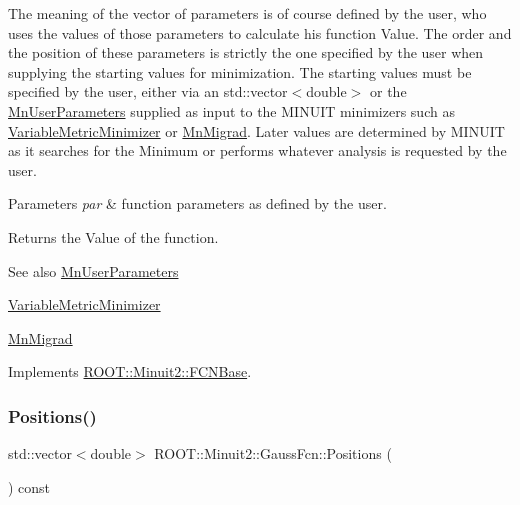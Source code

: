 The meaning of the vector of parameters is of course defined by the user, who uses the values of those parameters to calculate his function Value. The order and the position of these parameters is strictly the one specified by the user when supplying the starting values for minimization. The starting values must be specified by the user, either via an std\+::vector$<$double$>$ or the \mbox{\hyperlink{classROOT_1_1Minuit2_1_1MnUserParameters}{Mn\+User\+Parameters}} supplied as input to the M\+I\+N\+U\+IT minimizers such as \mbox{\hyperlink{classROOT_1_1Minuit2_1_1VariableMetricMinimizer}{Variable\+Metric\+Minimizer}} or \mbox{\hyperlink{classROOT_1_1Minuit2_1_1MnMigrad}{Mn\+Migrad}}. Later values are determined by M\+I\+N\+U\+IT as it searches for the Minimum or performs whatever analysis is requested by the user.


\begin{DoxyParams}{Parameters}
{\em par} & function parameters as defined by the user.\\
\hline
\end{DoxyParams}
\begin{DoxyReturn}{Returns}
the Value of the function.
\end{DoxyReturn}
\begin{DoxySeeAlso}{See also}
\mbox{\hyperlink{classROOT_1_1Minuit2_1_1MnUserParameters}{Mn\+User\+Parameters}} 

\mbox{\hyperlink{classROOT_1_1Minuit2_1_1VariableMetricMinimizer}{Variable\+Metric\+Minimizer}} 

\mbox{\hyperlink{classROOT_1_1Minuit2_1_1MnMigrad}{Mn\+Migrad}} 
\end{DoxySeeAlso}


Implements \mbox{\hyperlink{classROOT_1_1Minuit2_1_1FCNBase_ae4a86bd94d0d0f5ca6fc8f8ab2bb43cd}{R\+O\+O\+T\+::\+Minuit2\+::\+F\+C\+N\+Base}}.

\mbox{\label{classROOT_1_1Minuit2_1_1GaussFcn_a7098b4a70f063917479335d5f1d7473a}} 
\subsubsection{\texorpdfstring{Positions()}{Positions()}\hspace{0.1cm}{\footnotesize\ttfamily [1/2]}}
{\footnotesize\ttfamily std\+::vector$<$double$>$ R\+O\+O\+T\+::\+Minuit2\+::\+Gauss\+Fcn\+::\+Positions (\begin{DoxyParamCaption}{ }\end{DoxyParamCaption}) const\hspace{0.3cm}{\ttfamily [inline]}}

